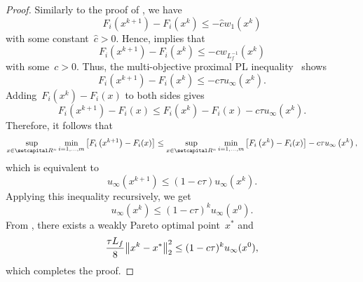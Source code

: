 \documentclass[../../main]{subfiles}
\begin{document}
\begin{proof}
    Similarly to the proof of , we have
    \begin{equation}
        F_i\left(x^{k + 1}\right) - F_i\left(x^k\right) \le - \hat{c} w_1\left(x^k\right)
    \end{equation}
    with some constant~$\hat{c} > 0$.
    Hence,  implies that
    \begin{equation}
        F_i\left(x^{k + 1}\right) - F_i\left(x^k\right) \le - c w_{L_f^{-1}}\left(x^k\right)
    \end{equation}
    with some~$c > 0$.
    Thus, the multi-objective proximal PL inequality~ shows
    \begin{equation}
        F_i\left(x^{k + 1}\right) - F_i\left(x^k\right) \le - c \tau u_\infty\left(x^k\right)
    .\end{equation}
    Adding~$F_i\left(x^k\right) - F_i(x)$ to both sides gives
    \begin{equation}
        F_i\left(x^{k + 1}\right) - F_i(x) \le F_i\left(x^k\right) - F_i(x) - c \tau u_\infty\left(x^k\right)
    .\end{equation}
    Therefore, it follows that
    \begin{equation}
        \sup_{x \in \setR^n} \min_{i = 1, \dots, m} \left[ F_i\left(x^{k + 1}\right) - F_i(x) \right] \le \sup_{x \in \setR^n} \min_{i = 1, \dots, m} \left[ F_i\left(x^k\right) - F_i(x) \right] - c \tau u_\infty\left(x^k\right)
    ,\end{equation}
    which is equivalent to
    \begin{equation}
        u_\infty\left(x^{k + 1}\right) \le ( 1 - c \tau ) u_\infty\left(x^k\right)
    .\end{equation}
    Applying this inequality recursively, we get
    \begin{equation}
        u_\infty\left(x^k\right) \le (1 - c \tau)^k u_\infty(x^0)
    .\end{equation}
    From , there exists a weakly Pareto optimal point~$x^*$ and
    \begin{equation}
        \frac{\tau L_f}{8} \norm*{x^k - x^*}_2^2 \le (1 - c \tau)^k u_\infty(x^0)
    ,\end{equation}
    which completes the proof.
\end{proof}
\end{document}
